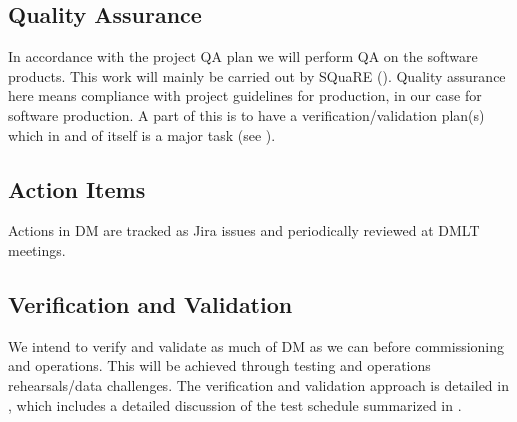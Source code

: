 \subsection {Quality Assurance  } \label{sect:pa}

In accordance with the project \gls{QA} plan  we will perform \gls{QA} on the software products.
This work will mainly be carried out by \gls{SQuaRE} ().
Quality assurance here means compliance with project guidelines for production, in our case for software production.
A part of this is to have a verification/validation plan(s) which in and of itself is a major task (see ).


\subsection{Action Items }
Actions in \gls{DM} are tracked as Jira issues and periodically reviewed at \gls{DMLT} meetings.


\subsection {Verification and \gls{Validation} } \label{sect:vanv}

We intend to verify and validate as much of \gls{DM} as we can before commissioning and operations.
This will be achieved through testing and operations rehearsals/data challenges.
The verification and validation approach is detailed in , which includes a detailed discussion of the test schedule summarized in .
